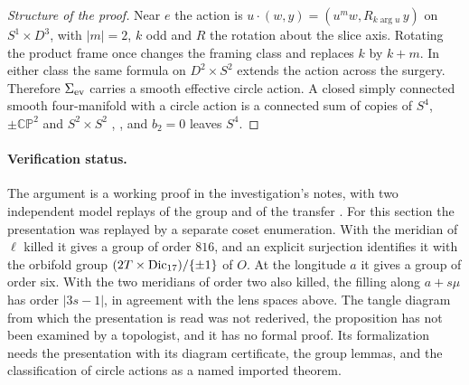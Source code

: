 \begin{proof}[Structure of the proof]
Near \(e\) the action is
\(u\cdot(w,y)=(u^{m}w,R_{k\arg u}\,y)\) on \(S^1\times D^3\), with
\(|m|=2\), \(k\) odd and \(R\) the rotation about the slice axis.
Rotating the product frame once changes the framing class and replaces
\(k\) by \(k+m\). In either class the same formula on \(D^2\times S^2\)
extends the action across the surgery. Therefore \(\Sigma_{\rm ev}\)
carries a smooth effective circle action. A closed simply connected
smooth four-manifold with a circle action is a connected sum of copies
of \(S^4\), \(\pm\mathbb{CP}^2\) and \(S^2\times S^2\)
\cite{Fintushel1976Circle,Pao1978Nonlinear},
\cite[Theorem 3.2]{GalazGarciaSearle2014}, and \(b_2=0\) leaves \(S^4\).
\end{proof}

\paragraph{Verification status.}
The argument is a working proof in the investigation's notes, with two
independent model replays of the group and of the transfer
\cite[TUBE, marked surgery and its independent replay]{Baker2026MarkedCutCalculations}.
For this section the presentation was replayed by a separate
coset enumeration. With the meridian of \(\ell\) killed it gives a group
of order \(816\), and an explicit surjection identifies it with the
orbifold group \((2T\times{\rm Dic}_{17})/\{\pm1\}\) of \(O\). At the
longitude \(a\) it gives a group of order six. With the two meridians of
order two also killed, the filling along \(a+s\mu\) has order
\(|3s-1|\), in agreement with the lens spaces above. The tangle diagram
from which the presentation is read was not rederived, the proposition
has not been examined by a topologist, and it has no formal proof. Its
formalization needs the presentation with its diagram certificate, the
group lemmas, and the classification of circle actions as a named
imported theorem.

